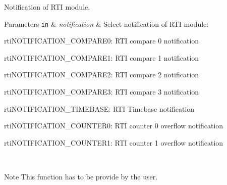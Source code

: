 Notification of R\+TI module. 


\begin{DoxyParams}[1]{Parameters}
\mbox{\tt in}  & {\em notification} & Select notification of R\+TI module\+:
\begin{DoxyItemize}
\item rti\+N\+O\+T\+I\+F\+I\+C\+A\+T\+I\+O\+N\+\_\+\+C\+O\+M\+P\+A\+R\+E0\+: R\+TI compare 0 notification
\item rti\+N\+O\+T\+I\+F\+I\+C\+A\+T\+I\+O\+N\+\_\+\+C\+O\+M\+P\+A\+R\+E1\+: R\+TI compare 1 notification
\item rti\+N\+O\+T\+I\+F\+I\+C\+A\+T\+I\+O\+N\+\_\+\+C\+O\+M\+P\+A\+R\+E2\+: R\+TI compare 2 notification
\item rti\+N\+O\+T\+I\+F\+I\+C\+A\+T\+I\+O\+N\+\_\+\+C\+O\+M\+P\+A\+R\+E3\+: R\+TI compare 3 notification
\item rti\+N\+O\+T\+I\+F\+I\+C\+A\+T\+I\+O\+N\+\_\+\+T\+I\+M\+E\+B\+A\+SE\+: R\+TI Timebase notification
\item rti\+N\+O\+T\+I\+F\+I\+C\+A\+T\+I\+O\+N\+\_\+\+C\+O\+U\+N\+T\+E\+R0\+: R\+TI counter 0 overflow notification
\item rti\+N\+O\+T\+I\+F\+I\+C\+A\+T\+I\+O\+N\+\_\+\+C\+O\+U\+N\+T\+E\+R1\+: R\+TI counter 1 overflow notification
\end{DoxyItemize}\\
\hline
\end{DoxyParams}
\begin{DoxyNote}{Note}
This function has to be provide by the user. 
\end{DoxyNote}

